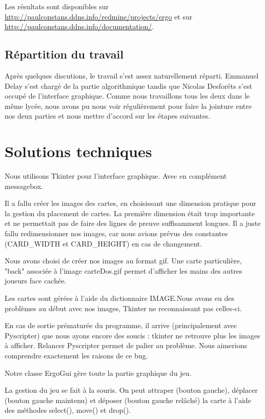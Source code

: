 \documentclass[12pt, algo]{cours}
\begin{document}
Les résultats sont disponibles sur \url{http://paulconstans.ddns.info/redmine/projects/ergo} et sur \url{http://paulconstans.ddns.info/documentation/}.

\subsection{Répartition du travail}

Après quelques discutions, le travail s'est assez naturellement réparti. Emmanuel Delay s'est chargé de la partie algorithmique tandis que Nicolas Desforêts s'est occupé de l'interface graphique. Comme nous travaillons tous les deux dans le même lycée, nous avons pu nous voir régulièrement pour faire la jointure entre nos deux parties et nous mettre d'accord sur les étapes suivantes.

\section{Solutions techniques}

Nous utilisons Tkinter pour l'interface graphique. Avec en complément messagebox.

Il a fallu créer les images des cartes, en choisissant une dimension pratique pour la gestion du placement de cartes. La première dimension était trop importante et ne permettait pas de faire des lignes de preuve suffisamment longues. Il a juste fallu redimensionner nos images, car nous avions prévus des constantes (CARD\_WIDTH et CARD\_HEIGHT) en cas de changement.

Nous avons choisi de créer nos images au format gif. Une carte particulière, "back" associée à l'image carteDos.gif permet d'afficher les mains des autres joueurs face cachée.

Les cartes sont gérées à l'aide du dictionnaire IMAGE.Nous avons eu des problèmes au début avec nos images, Tkinter ne reconnaissant pas celles-ci.

En cas de sortie prématurée du programme, il arrive (principalement avec Pyscripter) que nous ayons encore des soucis : tkinter ne retrouve plus les images à afficher. Relancer Pyscripter permet de palier au problème. Nous aimerions comprendre exactement les raisons de ce bug.

\smallskip

Notre classe ErgoGui gère toute la partie graphique du jeu.

La gestion du jeu se fait à la souris. On peut attraper (bouton gauche), déplacer (bouton gauche maintenu) et déposer (bouton gauche relâché) la carte à l'aide des méthodes select(), move() et drop().
\end{document}
